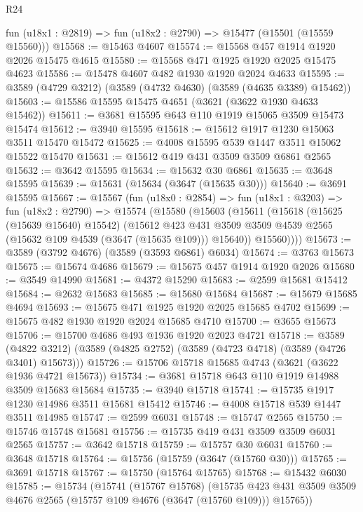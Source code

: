 \begin{lexlean}{R24}
\begin{coremodule}
    fun (u18x1 : @2819) => fun (u18x2 : @2790) => @15477 (@15501 (@15559 @15560)))
@15568 := @15463 @4607
@15574 := @15568 @457 @1914 @1920 @2026 @15475 @4615
@15580 := @15568 @471 @1925 @1920 @2025 @15475 @4623
@15586 := @15478 @4607 @482 @1930 @1920 @2024 @4633
@15595 := @3589 (@4729 @3212) (@3589 (@4732 @4630) (@3589 (@4635 @3389) @15462))
@15603 := @15586 @15595 @15475 @4651 (@3621 (@3622 @1930 @4633 @15462))
@15611 := @3681 @15595 @643 @110 @1919 @15065 @3509 @15473 @15474
@15612 := @3940 @15595
@15618 := @15612 @1917 @1230 @15063 @3511 @15470 @15472
@15625 := @4008 @15595 @539 @1447 @3511 @15062 @15522 @15470
@15631 := @15612 @419 @431 @3509 @3509 @6861 @2565
@15632 := @3642 @15595
@15634 := @15632 @30 @6861
@15635 := @3648 @15595
@15639 := @15631 (@15634 (@3647 (@15635 @30)))
@15640 := @3691 @15595
@15667 := @15567
    (fun (u18x0 : @2854) =>
    fun (u18x1 : @3203) =>
    fun (u18x2 : @2790) =>
    @15574
      (@15580
        (@15603
          (@15611
            (@15618
              (@15625 (@15639 @15640) @15542)
              (@15612
                @423
                @431
                @3509
                @3509
                @4539
                @2565
                (@15632 @109 @4539 (@3647 (@15635 @109)))
                @15640))
            @15560))))
@15673 := @3589 (@3792 @4676) (@3589 (@3593 @6861) @6034)
@15674 := @3763 @15673
@15675 := @15674 @4686
@15679 := @15675 @457 @1914 @1920 @2026
@15680 := @3549 @14990
@15681 := @4372 @15290
@15683 := @2599 @15681 @15412
@15684 := @2632 @15683
@15685 := @15680 @15684
@15687 := @15679 @15685 @4694
@15693 := @15675 @471 @1925 @1920 @2025 @15685 @4702
@15699 := @15675 @482 @1930 @1920 @2024 @15685 @4710
@15700 := @3655 @15673
@15706 := @15700 @4686 @493 @1936 @1920 @2023 @4721
@15718 := @3589
    (@4822 @3212)
    (@3589 (@4825 @2752) (@3589 (@4723 @4718) (@3589 (@4726 @3401) @15673)))
@15726 := @15706 @15718 @15685 @4743 (@3621 (@3622 @1936 @4721 @15673))
@15734 := @3681 @15718 @643 @110 @1919 @14988 @3509 @15683 @15684
@15735 := @3940 @15718
@15741 := @15735 @1917 @1230 @14986 @3511 @15681 @15412
@15746 := @4008 @15718 @539 @1447 @3511 @14985
@15747 := @2599 @6031
@15748 := @15747 @2565
@15750 := @15746 @15748 @15681
@15756 := @15735 @419 @431 @3509 @3509 @6031 @2565
@15757 := @3642 @15718
@15759 := @15757 @30 @6031
@15760 := @3648 @15718
@15764 := @15756 (@15759 (@3647 (@15760 @30)))
@15765 := @3691 @15718
@15767 := @15750 (@15764 @15765)
@15768 := @15432 @6030
@15785 := @15734
    (@15741
      (@15767 @15768)
      (@15735 @423 @431 @3509 @3509 @4676 @2565 (@15757 @109 @4676 (@3647 (@15760 @109))) @15765))

\end{coremodule}
\end{lexlean}
